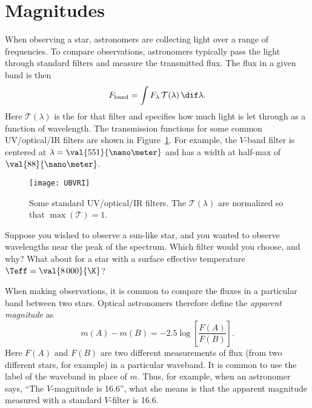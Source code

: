 \section{Magnitudes}
\label{s.magnitudes}

When observing a star, astronomers are collecting light over a range of frequencies. To compare observations, astronomers typically pass the light through standard filters and measure the transmitted flux. The flux in a given band is then
\[
	F_{\mathrm{band}} = \int F_{\lambda} \, \mathcal{T}(\lambda)\,\dif\lambda.
\]
Here $\mathcal{T}(\lambda)$ is the  for that filter and specifies how much light is let through as a function of wavelength.  The transmission functions for some common UV/optical/IR filters are shown in Figure~\ref{f.UBVRI}. For example, the $V$-band filter is centered at $\lambda=\val{551}{\nano\meter}$ and has a width at half-max of $\val{88}{\nano\meter}$. 
\begin{figure}
\texttt{[image: UBVRI]}
\caption[Standard filters]{\label{f.UBVRI} Some standard UV/optical/IR filters. The $\mathcal{T}(\lambda)$ are normalized so that $\max(\mathcal{T})=1$.}
\end{figure}

\begin{exercisebox}
Suppose you wished to observe a sun-like star, and you wanted to observe wavelengths near the peak of the spectrum.  Which filter would you choose, and why?  What about for a star with a surface effective temperature $\Teff = \val{8\,000}{\K}$? 
\end{exercisebox}

When making observations, it is common to compare the fluxes in a particular band between two stars. Optical astronomers therefore define the \emph{apparent magnitude} as
\begin{equation}\label{e.apparent-magnitude}
m(A) - m(B) = -2.5\log\left[\frac{F(A)}{F(B)}\right].
\end{equation}
Here $F(A)$ and $F(B)$ are two different measurements of flux (from two different stars, for example) in a particular waveband. It is common to use the label of the waveband in place of $m$. Thus, for example, when an astronomer says, ``The $V$-magnitude is 16.6'', what she means is that the apparent magnitude measured with a standard $V$-filter is 16.6.

